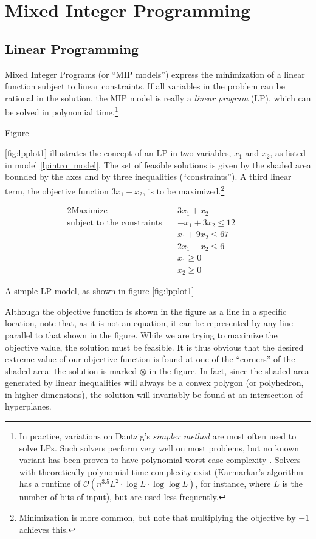 \documentclass[13pt, letterpaper, oneside]{book}
\begin{document}
\section{Mixed Integer Programming}
\subsection{Linear Programming}
Mixed Integer Programs (or ``MIP
models'') express the minimization of a linear function subject to linear
constraints. If all variables in the problem can be rational in the solution,
the MIP model is really a \textit{linear program} (LP), which can be solved in
polynomial time.\footnote{In practice, variations on Dantzig's \textit{simplex
method} are most often used to solve LPs. Such solvers perform very well on most
problems, but no known variant has been proven to have polynomial worst-case
complexity \citep{papadimitriou}. Solvers with theoretically polynomial-time
complexity exist (Karmarkar's algorithm \citet{karmarkar} has a runtime of
$\mathcal{O}(n^{3.5}L^2 \cdot \log L \cdot \log \log L)$, for instance, where
$L$ is the number of bits of input), but are used less frequently.}

Figure

\ref{fig:lpplot1} illustrates the concept of an LP in two variables, $x_1$ and
$x_2$, as listed in model \ref{lpintro_model}. The set of feasible solutions is given by the shaded area bounded by the axes
and by three inequalities (``constraints''). A third linear term, the objective
function $3x_1 + x_2$, is to be maximized.\footnote{Minimization is more common,
but note that multiplying the objective by $-1$ achieves this.} 
\begin{model}
\begin{alignat}{2}
\text{Maximize}\quad & 3x_1 + x_2 && \\
\text{subject to the constraints}\quad & -x_1 + 3x_2 \leq 12 &&\\
& x_1 + 9x_2 \leq 67 && \\
& 2x_1 - x_2 \leq 6 && \\
& x_1 \geq 0 && \\
& x_2 \geq 0 && 
\end{alignat}
\caption{A simple LP model, as shown in figure \ref{fig:lpplot1}}
\label{lpintro_model}
\end{model}

Although the objective function is shown in the figure as a line in a specific
location, note that, as it is not an equation, it can be represented by any line
parallel to that shown in the figure. While we are trying to maximize the
objective value, the solution must be feasible. It is thus obvious
that the desired extreme value of our objective function is found at one of the
``corners'' of the shaded area: the solution is marked $\otimes$ in the figure.
In fact, since the shaded area generated by linear inequalities will always be a
convex polygon (or polyhedron, in higher dimensions), the solution will
invariably be found at an intersection of hyperplanes.
\end{document}
